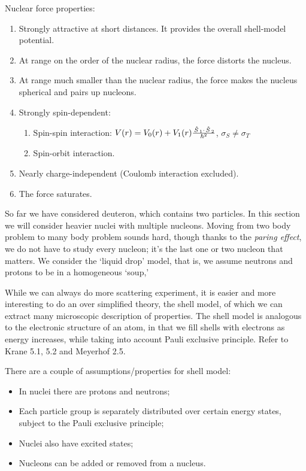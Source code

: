 \documentclass{school-22.101-notes}
\begin{document}
Nuclear force properties: 
\begin{enumerate}
\item Strongly attractive at short distances. It provides the overall shell-model potential.
\item At range on the order of the nuclear radius, the force distorts the nucleus. 
\item At range much smaller than the nuclear radius, the force makes the nucleus spherical and pairs up nucleons.
\item Strongly spin-dependent:
    \begin{enumerate}
    \item Spin-spin interaction: $V(r) = V_0(r) + V_1 (r) \frac{\left. \hat{S} \right._1 \cdot \left. \hat{S} \right._2}{\hbar^2} $, $\sigma_S \neq \sigma_T$
    \item Spin-orbit interaction.
    \end{enumerate}    
\item Nearly charge-independent (Coulomb interaction excluded).
\item The force saturates.
\end{enumerate}



So far we have considered deuteron, which contains two particles. In this section we will consider heavier nuclei with multiple nucleons. Moving from two body problem to many body problem sounds hard, though thanks to the \textit{paring effect}, we do not have to study every nucleon; it's the last one or two nucleon that matters. We consider the `liquid drop' model, that is, we assume neutrons and protons to be in a homogeneous `soup,' 


While we can always do more scattering experiment, it is easier and more interesting to do an over simplified theory, the shell model, of which we can extract many microscopic description of properties. The shell model is analogous to the electronic structure of an atom, in that we fill shells with electrons as energy increases, while taking into account Pauli exclusive principle. Refer to Krane 5.1, 5.2 and Meyerhof 2.5. 

There are a couple of assumptions/properties for shell model: 
\begin{itemize}
\item In nuclei there are protons and neutrons;
\item Each particle group is separately distributed over certain energy states, subject to the Pauli exclusive principle;
\item Nuclei also have excited states;
\item Nucleons can be added or removed from a nucleus. 
\end{itemize}
\end{document}
